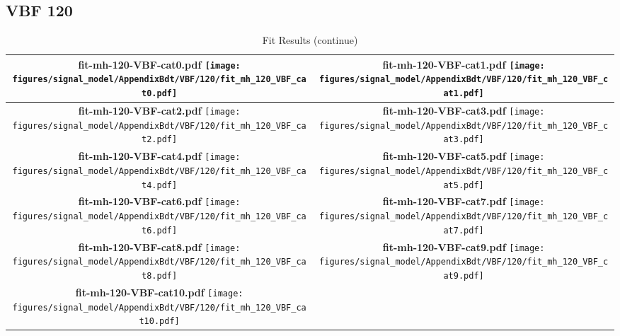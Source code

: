 \subsection{VBF 120}
\begin{longtable}{|c|c|}
\caption{Fit Results}
\endfirsthead
\caption{Fit Results (continue)}
\endhead
\hline
\parbox{0.47\textwidth}{
\centering
{\bfseries fit-mh-120-VBF-cat0.pdf}
\texttt{[image: figures/signal\_model/AppendixBdt/VBF/120/fit\_mh\_120\_VBF\_cat0.pdf]}
}
 & \parbox{0.47\textwidth}{
\centering
{\bfseries fit-mh-120-VBF-cat1.pdf}
\texttt{[image: figures/signal\_model/AppendixBdt/VBF/120/fit\_mh\_120\_VBF\_cat1.pdf]}
}
 \\
\hline
\parbox{0.47\textwidth}{
\centering
{\bfseries fit-mh-120-VBF-cat2.pdf}
\texttt{[image: figures/signal\_model/AppendixBdt/VBF/120/fit\_mh\_120\_VBF\_cat2.pdf]}
}
 & \parbox{0.47\textwidth}{
\centering
{\bfseries fit-mh-120-VBF-cat3.pdf}
\texttt{[image: figures/signal\_model/AppendixBdt/VBF/120/fit\_mh\_120\_VBF\_cat3.pdf]}
}
 \\
\hline
\parbox{0.47\textwidth}{
\centering
{\bfseries fit-mh-120-VBF-cat4.pdf}
\texttt{[image: figures/signal\_model/AppendixBdt/VBF/120/fit\_mh\_120\_VBF\_cat4.pdf]}
}
 & \parbox{0.47\textwidth}{
\centering
{\bfseries fit-mh-120-VBF-cat5.pdf}
\texttt{[image: figures/signal\_model/AppendixBdt/VBF/120/fit\_mh\_120\_VBF\_cat5.pdf]}
}
 \\
\hline
\parbox{0.47\textwidth}{
\centering
{\bfseries fit-mh-120-VBF-cat6.pdf}
\texttt{[image: figures/signal\_model/AppendixBdt/VBF/120/fit\_mh\_120\_VBF\_cat6.pdf]}
}
 & \parbox{0.47\textwidth}{
\centering
{\bfseries fit-mh-120-VBF-cat7.pdf}
\texttt{[image: figures/signal\_model/AppendixBdt/VBF/120/fit\_mh\_120\_VBF\_cat7.pdf]}
}
 \\
\hline
\parbox{0.47\textwidth}{
\centering
{\bfseries fit-mh-120-VBF-cat8.pdf}
\texttt{[image: figures/signal\_model/AppendixBdt/VBF/120/fit\_mh\_120\_VBF\_cat8.pdf]}
}
 & \parbox{0.47\textwidth}{
\centering
{\bfseries fit-mh-120-VBF-cat9.pdf}
\texttt{[image: figures/signal\_model/AppendixBdt/VBF/120/fit\_mh\_120\_VBF\_cat9.pdf]}
}
 \\
\hline
\parbox{0.47\textwidth}{
\centering
{\bfseries fit-mh-120-VBF-cat10.pdf}
\texttt{[image: figures/signal\_model/AppendixBdt/VBF/120/fit\_mh\_120\_VBF\_cat10.pdf]}
}
\end{longtable}

